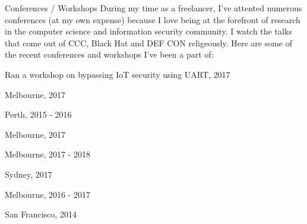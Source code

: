 \begin{cventries}
    \cventrysimple
        {Conferences / Workshops}
        {
            During my time as a freelancer, I've attented numerous conferences (at my own expense) because I love being at the forefront of research in the computer science and information security community. I watch the talks that come out of CCC, Black Hat and DEF CON religeously. Here are some of the recent conferences and workshops I've been a part of:
        }
        {
            \begin{cvitems}
                \item { \acvSubItemSep Ran a workshop on bypassing IoT security using UART, 2017}
                \item { \acvSubItemSep Melbourne, 2017}
                \item { \acvSubItemSep Perth, 2015 - 2016}
                \item { \acvSubItemSep Melbourne, 2017}
                \item { \acvSubItemSep Melbourne, 2017 - 2018}
                \item { \acvSubItemSep Sydney, 2017}
                \item { \acvSubItemSep Melbourne, 2016 - 2017}
                \item { \acvSubItemSep San Francisco, 2014}
            \end{cvitems}
        }



\end{cventries}
